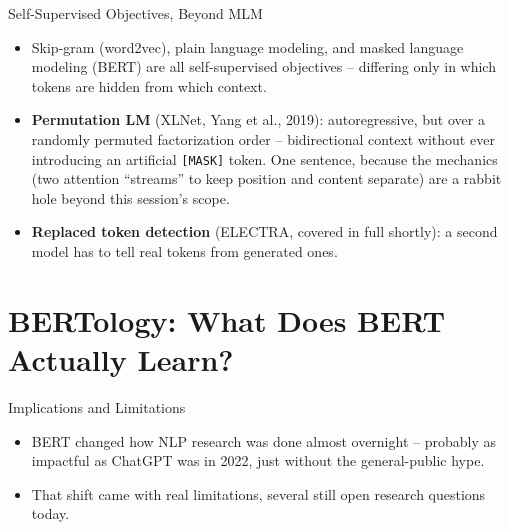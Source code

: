 \begin{vbframe}{Self-Supervised Objectives, Beyond MLM}

\vfill

\begin{itemize}
	\item Skip-gram (word2vec), plain language modeling, and masked language modeling (BERT) are all self-supervised objectives -- differing only in which tokens are hidden from which context.
	\item \textbf{Permutation LM} (XLNet, Yang et al., 2019): autoregressive, but over a randomly permuted factorization order -- bidirectional context without ever introducing an artificial {\tt [MASK]} token. One sentence, because the mechanics (two attention ``streams'' to keep position and content separate) are a rabbit hole beyond this session's scope.
	\item \textbf{Replaced token detection} (ELECTRA, covered in full shortly): a second model has to tell real tokens from generated ones.
\end{itemize}

\vfill

\end{vbframe}


\section{BERTology: What Does BERT Actually Learn?}

\begin{vbframe}{Implications and Limitations}

\vfill

\begin{itemize}
	\item BERT changed how NLP research was done almost overnight -- probably as impactful as ChatGPT was in 2022, just without the general-public hype.
	\item That shift came with real limitations, several still open research questions today.
\end{itemize}

\vfill

\end{vbframe}

